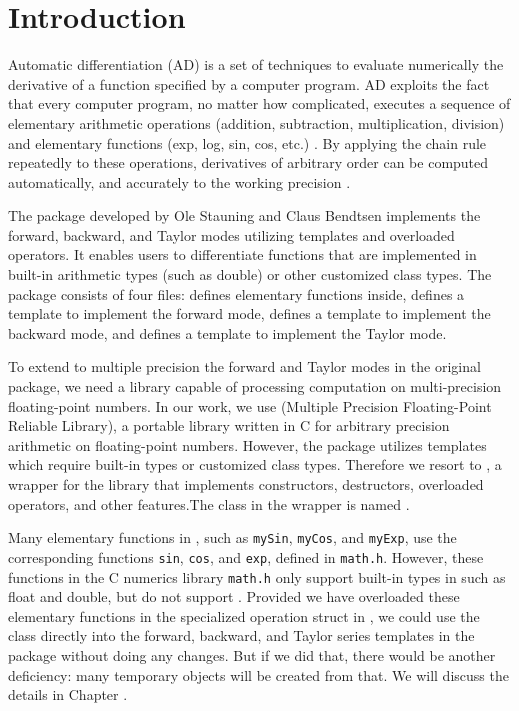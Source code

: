 
\chapter{Introduction}
Automatic differentiation (AD) is a set of techniques to evaluate numerically the derivative of a function specified by a computer program. AD exploits the fact that every computer program, no matter how complicated, executes a sequence of elementary arithmetic operations (addition, subtraction, multiplication, division) and elementary functions (exp, log, sin, cos, etc.) \cite{wikiAD}. By applying the chain rule repeatedly to these operations, derivatives of arbitrary order can be computed automatically, and accurately to the working precision \cite{Griewank2008}.

The \FADBADpp package developed by Ole Stauning and Claus Bendtsen implements the forward, backward, and Taylor modes utilizing \Cpp templates and overloaded operators. It enables users to differentiate functions that are implemented in built-in \Cpp arithmetic types (such as double) or other customized class types. The package consists of four files: \fadbad defines elementary functions inside, \fadiff defines a template \Fn to implement the forward mode, \badiff defines a template \Bn to implement the backward mode, and \tadiff defines a template \Tn  to implement the Taylor mode.

To extend to multiple precision the forward and Taylor modes in the original \FADBADpp package, we need a library capable of processing computation on multi-precision floating-point numbers. In our work, we use \MPFR (Multiple Precision Floating-Point Reliable Library), a portable library written in C for arbitrary precision arithmetic on floating-point numbers. However, the \FADBADpp package utilizes templates which require built-in \Cpp types or customized class types. Therefore we resort to \MPFRCpp, a wrapper for the \MPFR library that implements constructors, destructors, overloaded operators, and other \Cpp features.The class in the wrapper \MPFRCpp is named \mpreal. 

Many elementary functions in \fadbad, such as \texttt{mySin},  \texttt{myCos}, and \texttt{myExp},  use the corresponding functions  \texttt{sin},  \texttt{cos}, and \texttt{exp}, defined in \texttt{math.h}. However, these functions in the C numerics library {\tt math.h} only support built-in types in \Cpp such as float and double, but do not support \mpreal. Provided we have overloaded these elementary functions in the specialized operation struct in \fadbad, we could use the \mpreal class directly into the forward, backward, and Taylor series templates in the \FADBADpp package without doing any changes. But if we did that, there would be another deficiency: many temporary objects will be created from that. We will discuss the details in Chapter .

